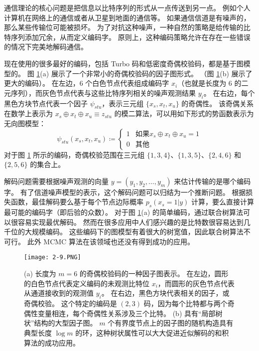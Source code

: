 通信理论的核心问题是把信息以比特序列的形式从一点传送到另一点。
例如个人计算机在网络上的通信或者从卫星到地面的通信等。
如果通信信道是有噪声的，那么某些传输位可能被损坏。
为了对抗这种噪声，一种自然的策略是给传输的比特序列添加冗余，从而定义编码字。
原则上，这种编码策略允许在存在一些错误的情况下完美地解码通信。

现在使用的很多最好的编码，包括 Turbo 码和低密度奇偶校验码，都是基于图模型的。
图 \ref{fig:2-9}(a) 展示了一个非常小的奇偶校验码的因子图形式。
（图 \ref{fig:2-9}(b) 展示了更大的编码）。
在左边，6 个白色节点代表组成编码字 $x_i$（也就是长度为 6 的二元序列），而灰色节点代表与这些比特序列相关的噪声观测结果 $y_i$。
在右边，每个黑色方块节点代表一个因子 $\psi_{stu}$，表示三元组 $\{x_s, x_t, x_u\}$ 的奇偶性。
该奇偶关系在数学上表示为 $x_s \oplus x_t \oplus x_u \equiv z_{stu}$ 的模二算法，可以用如下形式的势函数表示为无向图模型：
$$\psi_{stu}(x_s, x_t, x_u) \coloneqq \begin{cases}
    1 & \text{如果} x_s \oplus x_t \oplus x_u = 1 \\
    0 & \text{其他}
\end{cases}$$
对于图 \ref{fig:2-9} 所示的编码，奇偶校验范围在三元组 $\{1, 3, 4\}$、$\{1, 3, 5\}$、$\{2, 4, 6\}$ 和 $\{2, 5, 6\}$ 的集合上。

解码问题需要根据噪声观测的向量 $y = (y_1, y_2, \dots, y_m)$ 来估计传输的是哪个编码字。
有了信道噪声模型的表示，这个解码问题可以归结为一个推断问题。
根据损失函数，最佳解码要么基于每个节点边际概率 $p_s(x_s = 1|y)$ 计算，要么直接计算最可能的编码字（即后验的众数）。
对于图 \ref{fig:2-9}(a) 的简单编码，通过联合树算法可以很容易实现最优解码。
然而在很多应用中人们感兴趣的是比特数很容易达到几千位的大规模编码。
这些编码下的图模型有着很大的树宽值，因此联合树算法不可行。
此外 MCMC 算法在该领域也还没有得到成功的应用。

\begin{figure}[htbp]
    \centering
    \texttt{[image: 2-9.PNG]}
    \caption{
        (a) 长度为 $m = 6$ 的奇偶校验码的一种因子图表示。
        在左边，圆形的白色节点代表定义编码的未观测比特位 $x_i$，而圆形的灰色节点代表从通道接收到的观测值 $y_i$。
        在右边，黑色方块代表相关的因子，或奇偶校验。
        这个特定的编码是 $(2, 3)$ 码，因为每个比特都与两个奇偶性变量相连，每个奇偶性关系涉及三个比特。
        (b) 具有“局部树状”结构的大型因子图。
        $m$ 个有界度节点上的因子图的随机构造具有典型长度 $\log{m}$ 的环，这种树状属性可以大大促进近似解码的和积算法的成功应用。
    }\label{fig:2-9}
\end{figure}

